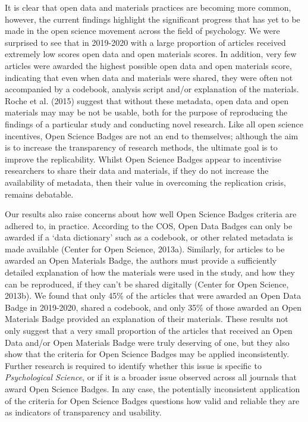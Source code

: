 \documentclass[
  english,
  man,floatsintext]{apa6}
\begin{document}
It is clear that open data and materials practices are becoming more common, however, the current findings highlight the significant progress that has yet to be made in the open science movement across the field of psychology. We were surprised to see that in 2019-2020 with a large proportion of articles received extremely low scores open data and open materials scores. In addition, very few articles were awarded the highest possible open data and open materials score, indicating that even when data and materials were shared, they were often not accompanied by a codebook, analysis script and/or explanation of the materials. Roche et al. (2015) suggest that without these metadata, open data and open materials may may be not be usable, both for the purpose of reproducing the findings of a particular study and conducting novel research. Like all open science incentives, Open Science Badges are not an end to themselves; although the aim is to increase the transparency of research methods, the ultimate goal is to improve the replicability. Whilst Open Science Badges appear to incentivise researchers to share their data and materials, if they do not increase the availability of metadata, then their value in overcoming the replication crisis, remains debatable.

Our results also raise concerns about how well Open Science Badges criteria are adhered to, in practice. According to the COS, Open Data Badges can only be awarded if a `data dictionary' such as a codebook, or other related metadata is made available (Center for Open Science, 2013a). Similarly, for articles to be awarded an Open Materials Badge, the authors must provide a sufficiently detailed explanation of how the materials were used in the study, and how they can be reproduced, if they can't be shared digitally (Center for Open Science, 2013b). We found that only 45\% of the articles that were awarded an Open Data Badge in 2019-2020, shared a codebook, and only 35\% of those awarded an Open Materials Badge provided an explanation of their materials. These results not only suggest that a very small proportion of the articles that received an Open Data and/or Open Materials Badge were truly deserving of one, but they also show that the criteria for Open Science Badges may be applied inconsistently. Further research is required to identify whether this issue is specific to \emph{Psychological Science}, or if it is a broader issue observed across all journals that award Open Science Badges. In any case, the potentially inconsistent application of the criteria for Open Science Badges questions how valid and reliable they are as indicators of transparency and usability.
\end{document}
